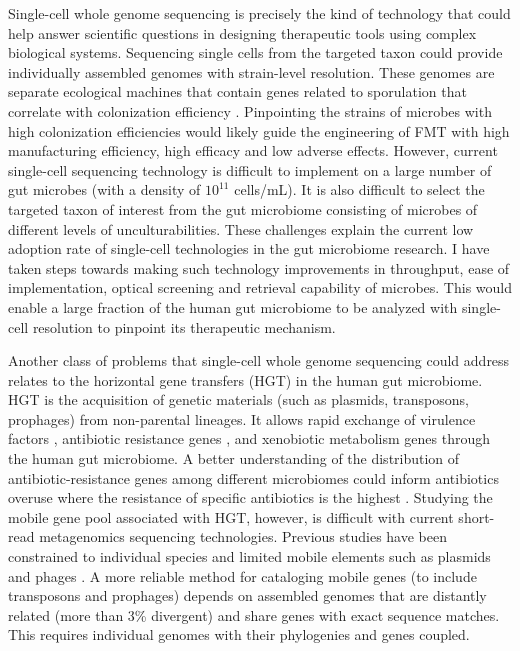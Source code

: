 Single-cell whole genome sequencing is precisely the kind of technology that could help answer scientific questions in designing therapeutic tools using complex biological systems. Sequencing single cells from the targeted taxon could provide individually assembled genomes with strain-level resolution. These genomes are separate ecological machines that contain genes related to sporulation that correlate with colonization efficiency \cite{Nayfach:2016dm}. Pinpointing the strains of microbes with high colonization efficiencies would likely guide the engineering of FMT with high manufacturing efficiency, high efficacy and low adverse effects. However, current single-cell sequencing technology is difficult to implement on a large number of gut microbes (with a density of $10^{11}$ cells/mL). It is also difficult to select the targeted taxon of interest from the gut microbiome consisting of microbes of different levels of unculturabilities. These challenges explain the current low adoption rate of single-cell technologies in the gut microbiome research. I have taken steps towards making such technology improvements in throughput, ease of implementation, optical screening and retrieval capability of microbes. This would enable a large fraction of the human gut microbiome to be analyzed with single-cell resolution to pinpoint its therapeutic mechanism. 

Another class of problems that single-cell whole genome sequencing could address relates to the horizontal gene transfers (HGT) in the human gut microbiome. HGT is the acquisition of genetic materials (such as plasmids, transposons, prophages) from non-parental lineages. It allows rapid exchange of virulence factors \cite{Chen:2009cr}, antibiotic resistance genes \cite{Smillie:2011jc,Brito:2016cd}, and xenobiotic metabolism genes \cite{Hehemann:2010wk} through the human gut microbiome. A better understanding of the distribution of antibiotic-resistance genes among different microbiomes could inform antibiotics overuse where the resistance of specific antibiotics is the highest \cite{Brito:2016cd}. Studying the mobile gene pool associated with HGT, however, is difficult with current short-read metagenomics sequencing technologies. Previous studies have been constrained to individual species \cite{Coyne:2014ez} and limited mobile elements such as plasmids \cite{Jones:2010js} and phages \cite{Breitbart:2003uf}. A more reliable method for cataloging mobile genes (to include transposons and prophages) depends on assembled genomes that are distantly related (more than 3\% divergent) and share genes with exact sequence matches. This requires individual genomes with their phylogenies and genes coupled. 

